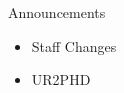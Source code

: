 \begin{frame}{Announcements}
    \begin{itemize}
        \item Staff Changes
        \item UR2PHD
    \end{itemize}
\end{frame}

